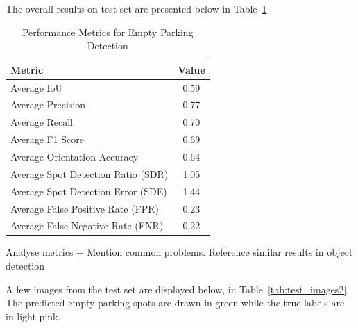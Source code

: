 The overall results on test set are presented below in Table~\ref{tab:metrics2}

\begin{table}[h]
  \centering
  \begin{tabular}{|l|c|}
    \hline
    \textbf{Metric}                    & \textbf{Value} \\ \hline
    Average IoU                        & 0.59           \\ \hline
    Average Precision                  & 0.77           \\ \hline
    Average Recall                     & 0.70           \\ \hline
    Average F1 Score                   & 0.69           \\ \hline
    Average Orientation Accuracy       & 0.64           \\ \hline
    Average Spot Detection Ratio (SDR) & 1.05           \\ \hline
    Average Spot Detection Error (SDE) & 1.44           \\ \hline
    Average False Positive Rate (FPR)  & 0.23           \\ \hline
    Average False Negative Rate (FNR)  & 0.22           \\ \hline
  \end{tabular}
  \caption{Performance Metrics for Empty Parking Detection}
  \label{tab:metrics2}
\end{table}

Analyse metrics + Mention common problems. Reference similar results in object detection

A few images from the test set are displayed below, in Table~\ref{tab:test_images2}
The predicted empty parking spots are drawn in green while the true labels are in light pink.

